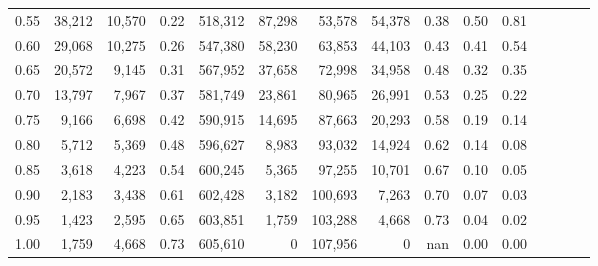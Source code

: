 \begin{tabular}{rrrcrrrrrrrrrrr}
0.55 &  38,212 &  10,570 &                                       0.22 &  518,312 &   87,298 &   53,578 &   54,378 &  0.38 &  0.50 &                         0.81 \\
0.60 &  29,068 &  10,275 &                                       0.26 &  547,380 &   58,230 &   63,853 &   44,103 &  0.43 &  0.41 &                         0.54 \\
0.65 &  20,572 &   9,145 &                                       0.31 &  567,952 &   37,658 &   72,998 &   34,958 &  0.48 &  0.32 &                         0.35 \\
0.70 &  13,797 &   7,967 &                                       0.37 &  581,749 &   23,861 &   80,965 &   26,991 &  0.53 &  0.25 &                         0.22 \\
0.75 &   9,166 &   6,698 &                                       0.42 &  590,915 &   14,695 &   87,663 &   20,293 &  0.58 &  0.19 &                         0.14 \\
0.80 &   5,712 &   5,369 &                                       0.48 &  596,627 &    8,983 &   93,032 &   14,924 &  0.62 &  0.14 &                         0.08 \\
0.85 &   3,618 &   4,223 &                                       0.54 &  600,245 &    5,365 &   97,255 &   10,701 &  0.67 &  0.10 &                         0.05 \\
0.90 &   2,183 &   3,438 &                                       0.61 &  602,428 &    3,182 &  100,693 &    7,263 &  0.70 &  0.07 &                         0.03 \\
0.95 &   1,423 &   2,595 &                                       0.65 &  603,851 &    1,759 &  103,288 &    4,668 &  0.73 &  0.04 &                         0.02 \\
1.00 &   1,759 &   4,668 &                                       0.73 &  605,610 &        0 &  107,956 &        0 &   nan &  0.00 &                         0.00 \\
\bottomrule
\end{tabular}
